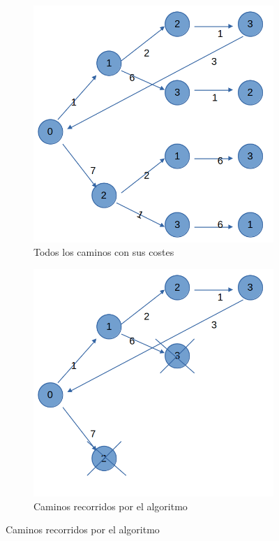 \documentclass{article}
\begin{document}
\begin{figure}[!hbt]
    \centering
    \begin{subfigure}{0.4\textwidth}
        \centering
        \includegraphics[width=\textwidth]{P3/Prosa/arbol_coste.png}
        \caption{\centering Todos los caminos con sus costes}
        \label{fig:arbol_coste}
    \end{subfigure}
    \hfill
    \begin{subfigure}{0.4\textwidth}
        \centering
        \includegraphics[width=\textwidth]{P3/Prosa/arbol_branch_bound.png}
        \caption{\centering Caminos recorridos por el algoritmo}
        \label{fig:arbol_branch_bound}
    \end{subfigure}
\end{figure}
\end{document}

